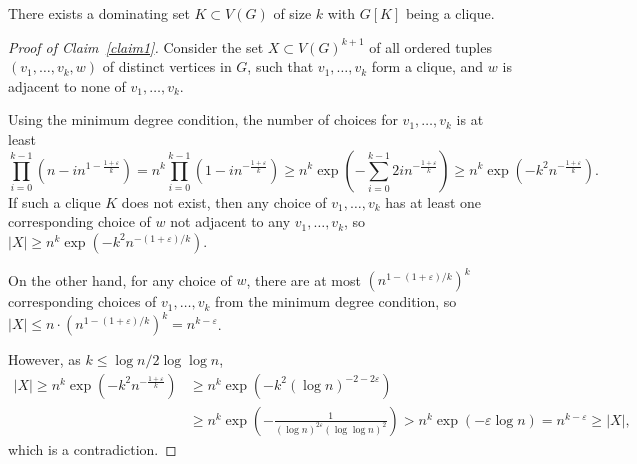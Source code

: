 \documentclass[10pt,a4paper]{amsart}
\def\eps{\varepsilon}
\begin{document}
\begin{claim}\label{claim1}
There exists a dominating set $K\subset V(G)$ of size $k$ with $G[K]$ being a clique.
\end{claim}

\begin{proof}[Proof of Claim~\ref{claim1}]
Consider the set $X\subset V(G)^{k+1}$ of all ordered tuples $(v_1,\ldots,v_k,w)$ of distinct vertices in $G$, such that $v_1,\ldots,v_k$ form a clique, and $w$ is adjacent to none of $v_1,\ldots,v_k$. 

Using the minimum degree condition, the number of choices for $v_1,\ldots,v_k$ is at least 
\[\prod_{i=0}^{k-1}\left(n-in^{1-\frac{1+\eps}k}\right)=n^k\prod_{i=0}^{k-1}\left(1-in^{-\frac{1+\eps}k}\right)\geq n^k\exp\left(-\sum_{i=0}^{k-1}2in^{-\frac{1+\eps}k}\right)\geq n^k\exp\left(-k^2n^{-\frac{1+\eps}k}\right).\]
If such a clique $K$ does not exist, then any choice of $v_1,\ldots,v_k$ has at least one corresponding choice of $w$ not adjacent to any $v_1,\ldots,v_k$, so $|X|\geq n^k\exp(-k^2n^{-(1+\eps)/k})$.

On the other hand, for any choice of $w$, there are at most $(n^{1-(1+\eps)/k})^k$ corresponding choices of $v_1,\ldots,v_k$ from the minimum degree condition, so $|X|\leq n\cdot(n^{1-(1+\eps)/k})^k=n^{k-\eps}$. 

However, as $k\leq\log n/2\log\log n$, 
\begin{align*}
|X|\geq n^k\exp\left(-k^2n^{-\frac{1+\eps}k}\right)&\geq n^k\exp\left(-k^2(\log n)^{-2-2\eps}\right)\\
&\geq n^k\exp\left(-\frac1{(\log n)^{2\eps}(\log\log n)^2}\right)>n^k\exp\left(-\eps\log n\right)=n^{k-\eps}\geq|X|,
\end{align*}
which is a contradiction. 
\renewcommand{\qedsymbol}{$\boxdot$}
\end{proof}
\end{document}
